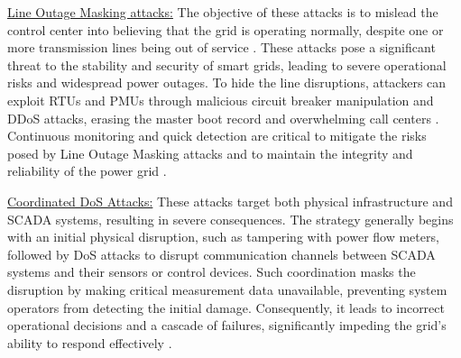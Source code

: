 \documentclass[10pt, journal]{IEEEtran}
\begin{document}
			
\underline{Line Outage Masking attacks:} The objective of these attacks is to mislead the control center into believing that the grid is operating normally, despite one or more transmission lines being out of service \cite{li2016analyzing,chung2018local}. These attacks pose a significant threat to the stability and security of smart grids, leading to severe operational risks and widespread power outages\cite{case2016analysis}. To hide the line disruptions, attackers can exploit RTUs and PMUs through malicious circuit breaker manipulation and DDoS attacks, erasing the master boot record and overwhelming call centers \cite{li2015bilevel, liu2016masking, tian2019multilevel}. Continuous monitoring and quick detection are critical to mitigate the risks posed by Line Outage Masking attacks and to maintain the integrity and reliability of the power grid \cite{soltan2018react, soltan2018expose, soltan2019line}. 

			
\underline{Coordinated DoS Attacks:} These attacks target both physical infrastructure and SCADA systems, resulting in severe consequences. The strategy generally begins with an initial physical disruption, such as tampering with power flow meters, followed by DoS attacks to disrupt communication channels between SCADA systems and their sensors or control devices. Such coordination masks the disruption by making critical measurement data unavailable, preventing system operators from detecting the initial damage. Consequently, it leads to incorrect operational decisions and a cascade of failures, significantly impeding the grid's ability to respond effectively \cite{tian2020coordinated}.

\end{document}
